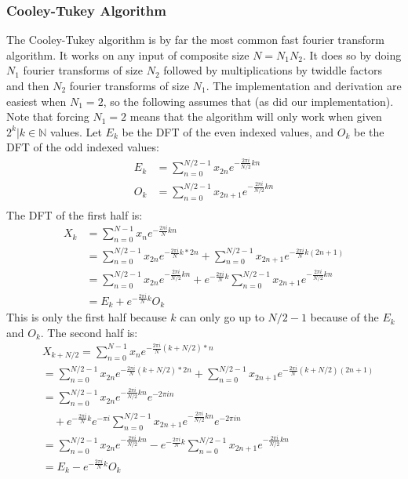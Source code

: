 	\subsubsection{Cooley-Tukey Algorithm}
		The Cooley-Tukey algorithm is by far the most common fast fourier transform algorithm. It works on any input of composite size $N=N_1N_2$. It does so by doing $N_1$ fourier transforms of size $N_2$ followed by multiplications by twiddle factors and then $N_2$ fourier transforms of size $N_1$. The implementation and derivation are easiest when $N_1=2$, so the following assumes that (as did our implementation). Note that forcing $N_1=2$ means that the algorithm will only work when given $2^k|k\in\mathbb{N}$ values. Let $E_k$ be the DFT of the even indexed values, and $O_k$ be the DFT of the odd indexed values:
		\begin{align*}
			E_k &= \sum_{n=0}^{N/2-1}x_{2n}e^{-\frac{2\pi i}{N/2}kn} \\
			O_k &= \sum_{n=0}^{N/2-1}x_{2n+1}e^{-\frac{2\pi i}{N/2}kn}\\
		\end{align*}
		The DFT of the first half is:\\
		\begin{align*}
			X_k &= \sum_{n=0}^{N-1}x_ne^{-\frac{2\pi i}{N}kn} \\
			&=\sum_{n=0}^{N/2-1}x_{2n}e^{-\frac{2\pi i}{N}k*2n} + \sum_{n=0}^{N/2-1}x_{2n+1}e^{-\frac{2\pi i}{N}k(2n+1)} \\
			&=\sum_{n=0}^{N/2-1}x_{2n}e^{-\frac{2\pi i}{N/2}kn} + e^{-\frac{2\pi i}{N}k}\sum_{n=0}^{N/2-1}x_{2n+1}e^{-\frac{2\pi i}{N/2}kn} \\
			&=E_k+e^{-\frac{2\pi i}{N}k}O_k
		\end{align*}
		This is only the first half because $k$ can only go up to $N/2-1$ because of the $E_k$ and $O_k$. The second half is:\\
		\begin{align*}
			&X_{k+N/2} = \sum_{n=0}^{N-1}x_ne^{-\frac{2\pi i}{N}(k+N/2)*n} \\
			&=\sum_{n=0}^{N/2-1}x_{2n}e^{-\frac{2\pi i}{N}(k+N/2)*2n} + \sum_{n=0}^{N/2-1}x_{2n+1}e^{-\frac{2\pi i}{N}(k+N/2)(2n+1)} \\
			&=\sum_{n=0}^{N/2-1}x_{2n}e^{-\frac{2\pi i}{N/2}kn}e^{-2\pi in} \\
			& \quad + e^{-\frac{2\pi i}{N}k}e^{-\pi i} \sum_{n=0}^{N/2-1}x_{2n+1}e^{-\frac{2\pi i}{N/2}kn}e^{-2\pi in} \\
			&=\sum_{n=0}^{N/2-1}x_{2n}e^{-\frac{2\pi i}{N/2}kn} - e^{-\frac{2\pi i}{N}k}\sum_{n=0}^{N/2-1}x_{2n+1}e^{-\frac{2\pi i}{N/2}kn} \\
			&=E_k-e^{-\frac{2\pi i}{N}k}O_k
		\end{align*}
